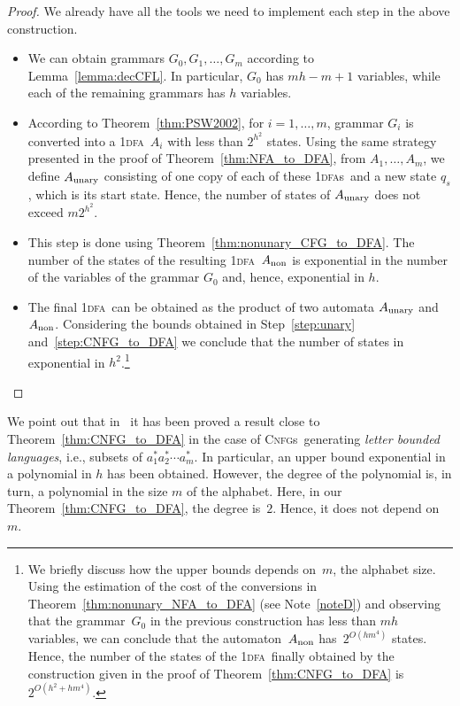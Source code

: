 \documentclass[11pt]{article}
\newcommand*{\ow}{\textsc{1}}
\newcommand*{\owdfa}{\ow\textsc{dfa}}
\newcommand*{\owdfas}{\ow\textsc{dfa}s}
\newcommand*{\cnfgs}{\textsc{Cnfg}s}
\begin{document}
\begin{proof}
We already have all the tools we need to implement each step in the above construction.
\begin{itemize}  
\item[\ref{step:split}.]
  We can obtain grammars $G_0, G_1, \ldots, G_m$ according to Lemma~\ref{lemma:decCFL}.
  In particular, $G_0$ has $mh-m+1$ variables, while each of the remaining grammars has $h$ variables.
\item[\ref{step:unary}.]
  According to Theorem~\ref{thm:PSW2002}, for $i=1,\ldots,m$, grammar $G_i$ is converted into a \owdfa\ $A_i$
  with less than $2^{h^2}$ states. Using the same strategy presented in the proof of Theorem~\ref{thm:NFA_to_DFA},
  {}from $A_1,\ldots,A_m$, we define $A_{\rm unary}$ consisting of one copy of each of these \owdfas\ and a 
  new state $q_s$, which is its start state. Hence, the number of states of $A_{\rm unary}$ does not
  exceed $m 2^{h^2}$. 
\item[\ref{step:CNFG_to_DFA}.]
  This step is done using Theorem~\ref{thm:nonunary_CFG_to_DFA}. The number of the states of the resulting
  \owdfa~$A_{\rm non}$ is exponential in the number of the variables of
  the grammar $G_0$ and, hence, exponential in $h$.
\item[\ref{step:last_merge}.]
  The final \owdfa\ can be obtained as the product of two automata $A_{\rm unary}$ and $A_{\rm non}$.
  Considering the bounds obtained in Step~\ref{step:unary} and~\ref{step:CNFG_to_DFA} we conclude that
  the number of states in exponential in $h^2$.\footnote{We briefly discuss how the upper bounds depends on~$m$, the alphabet size.
  Using the estimation of the cost of the conversions in Theorem~\ref{thm:nonunary_NFA_to_DFA}
  (see Note~\ref{noteD}) and
  observing that the grammar~$G_0$ in the previous construction has less than $mh$ variables,
  we can conclude that the automaton~$A_{\rm non}$ has~$2^{O(hm^4)}$ states.
  Hence, the number of the states of the \owdfa\ finally obtained by the construction given in the proof
  of Theorem~\ref{thm:CNFG_to_DFA} is~$2^{O(h^2+hm^4)}$.\label{noteE}
}\qedhere
\end{itemize}
\end{proof}

\noindent
We point out that in~\cite{LavadoPighizzini2012} it has been proved a result close to Theorem~\ref{thm:CNFG_to_DFA}
in the case of \cnfgs\ generating \emph{letter bounded languages}, i.e., subsets of $a_1^*a_2^*\cdots a_m^*$.
In particular, an upper bound exponential in a polynomial in $h$ has been obtained.
However, the degree of the polynomial is, in turn, a polynomial in the size $m$ of the alphabet.
Here, in  our Theorem~\ref{thm:CNFG_to_DFA}, the degree is~$2$. Hence, it does not depend on~$m$.
\end{document}
